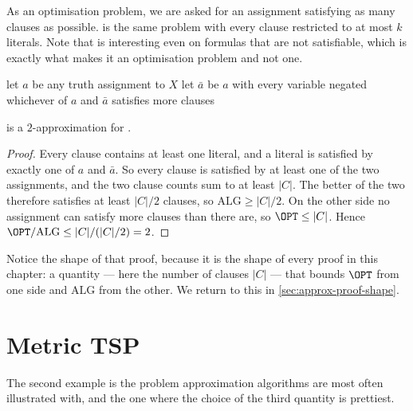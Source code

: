As an optimisation problem, we are asked for an assignment satisfying as many
clauses as possible.  is the same problem with every clause
restricted to at most $k$ literals. Note that  is interesting
even on formulas that are not satisfiable, which is exactly what makes it an
optimisation problem and  not one.

\begin{algorithm}[ht]
\caption{$2$-approximation for }
\label{alg:maxsat}
\begin{algorithmic}[1]
  \State let $a$ be any truth assignment to $X$
  \State let $\bar a$ be $a$ with every variable negated
  \State \Return whichever of $a$ and $\bar a$ satisfies more clauses
\end{algorithmic}
\end{algorithm}

\begin{theorem}\label{thm:maxsat}
 is a $2$-approximation for .
\end{theorem}

\begin{proof}
Every clause contains at least one literal, and a literal is satisfied by
exactly one of $a$ and $\bar a$. So every clause is satisfied by at least one
of the two assignments, and the two clause counts sum to at least $|C|$. The
better of the two therefore satisfies at least $|C|/2$ clauses, so
$\mathrm{ALG} \ge |C|/2$. On the other side no assignment can satisfy more
clauses than there are, so $\OPT \le |C|$. Hence
$\OPT/\mathrm{ALG} \le |C| / (|C|/2) = 2$.
\end{proof}

Notice the shape of that proof, because it is the shape of every proof in this
chapter: a quantity --- here the number of clauses $|C|$ --- that bounds $\OPT$
from one side and $\mathrm{ALG}$ from the other. We return to this in
\cref{sec:approx-proof-shape}.

\section{Metric TSP}
\label{sec:metric-tsp}

The second example is the problem approximation algorithms are most often
illustrated with, and the one where the choice of the third quantity is
prettiest.

